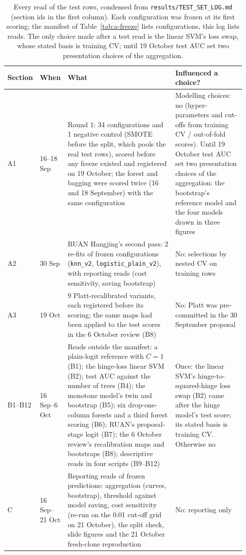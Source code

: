 \begin{table}[!htbp]
  \caption{Every read of the test rows, condensed from \texttt{results/TEST\_SET\_LOG.md} (section ids in the first column). Each configuration was frozen at its first scoring; the manifest of Table~\ref{tab:a-freeze} lists configurations, this log lists reads. The only choice made after a test read is the linear SVM's loss swap, whose stated basis is training CV; until 19 October test AUC set two presentation choices of the aggregation.}
  \label{tab:a-testlog}
  \centering
  \footnotesize
  \setlength{\tabcolsep}{3pt}
  \begin{tabular}{@{}L{0.08\linewidth}L{0.11\linewidth}L{0.46\linewidth}L{0.30\linewidth}@{}}
    \toprule
    Section & When & What & Influenced a choice? \\
    \midrule
    A1 & 16--18 Sep & Round 1: 34 configurations and 1 negative control (SMOTE before the split, which pools the real test rows), scored before any freeze existed and registered on 19 October; the forest and bagging were scored twice (16 and 18 September) with the same configuration & Modelling choices: no (hyper-parameters and cut-offs from training CV / out-of-fold scores). Until 19 October test AUC set two presentation choices of the aggregation: the bootstrap's reference model and the four models drawn in three figures \\
    A2 & 30 Sep & RUAN Hangjing's second pass: 2 re-fits of frozen configurations (\texttt{knn\_v2}, \texttt{logistic\_plain\_v2}), with reporting reads (cost sensitivity, saving bootstrap) & No: selections by nested CV on training rows \\
    A3 & 19 Oct & 9 Platt-recalibrated variants, each registered before its scoring; the same maps had been applied to the test scores in the 6 October review (B8) & No: Platt was pre-committed in the 30 September proposal \\
    B1--B12 & 16 Sep--6 Oct & Reads outside the manifest: a plain-logit reference with $C = 1$ (B1); the hinge-loss linear SVM (B2); test AUC against the number of trees (B4); the monotone model's twin and bootstrap (B5); six drop-one-column forests and a third forest scoring (B6); RUAN's proposal-stage logit (B7); the 6 October review's recalibration maps and bootstraps (B8); descriptive reads in four scripts (B9--B12) & Once: the linear SVM's hinge-to-squared-hinge loss swap (B2) came after the hinge model's test score; its stated basis is training CV. Otherwise no \\
    C & 16 Sep--21 Oct & Reporting reads of frozen predictions: aggregation (curves, bootstrap), threshold against model saving, cost sensitivity (re-run on the 0.01 cut-off grid on 21 October), the split check, slide figures and the 21 October fresh-clone reproduction & No: reporting only \\

\end{tabular}
\end{table}
